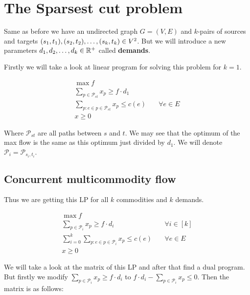 \chapter{The Sparsest cut problem}

Same as before we have an undirected graph $G = (V,E)$ and $k$-pairs of sources and targets $(s_{1},t_{1}), (s_{2}, t_{2}), \dots,\\ (s_{k}, t_{k}) \in V^{2}$. But we will introduce a new parameters $d_{1}, d_{2}, \dots, d_{k} \in \mathbb{R}^{+}$ called \textbf{demands}.

Firstly we will take a look at linear program for solving this problem for $k = 1$.

$$
\begin{aligned}
	\max f \\
	\sum_{p \in \mathcal{P}_{st}} x_{p} \geq f \cdot d_{1} \\
	\sum_{p : e \in p \in \mathcal{P}_{st}} x_{p} \leq c(e) & \quad \forall e \in E\\
	x \geq 0
\end{aligned}
$$

Where $\mathcal{P}_{st}$ are all paths between $s$ and $t$. We may see that the optimum of the max flow is the same as this optimum just divided by $d_{1}$. We will denote $\mathcal{P}_{i} = \mathcal{P}_{s_{i}, t_{i}}$.

\section{Concurrent multicommodity flow}

Thus we are getting this LP for all $k$ commodities and $k$ demands.

$$
\begin{aligned}
	\max f \\
	\sum_{p \in \mathcal{P}_{i}} x_{p} \geq f \cdot d_{i} & \quad \forall i \in [k]\\
	\sum_{i = 0}^{k} \sum_{p: e \in p \in \mathcal{P}_{i}} x_{p} \leq c(e) & \quad \forall e \in E\\
	x \geq 0
\end{aligned}
$$

We will take a look at the matrix of this LP and after that find a dual program. But firstly we modify $\sum_{p \in \mathcal{P}_{i}} x_{p} \geq f \cdot d_{i}$ to $f \cdot d_{i} - \sum_{p \in \mathcal{P}_{i}} x_{p} \leq 0$. Then the matrix is as follows:


